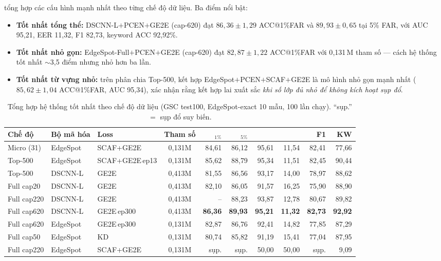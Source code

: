 \documentclass[12pt,a4paper]{report}
\newcommand{\acc}{\text{ACC}}
\newcommand{\eer}{\text{EER}}
\newcommand{\auc}{\text{AUC}}
\newcommand{\best}[1]{\textbf{#1}}
\begin{document}
 tổng hợp các cấu hình mạnh nhất theo từng chế độ dữ liệu.
Ba điểm nổi bật:
\begin{itemize}[leftmargin=1.3em,itemsep=2pt]
\item \textbf{Tốt nhất tổng thể:} DSCNN-L$+$PCEN$+$GE2E (cap-620) đạt
\best{$86{,}36\pm1{,}29$} ACC@1\%FAR và $89{,}93\pm0{,}65$ tại 5\% FAR, với AUC
95{,}21, EER 11{,}32, F1 82{,}73, keyword ACC 92{,}92\%.
\item \textbf{Tốt nhất nhỏ gọn:} EdgeSpot-Full$+$PCEN$+$GE2E (cap-620) đạt
$82{,}87\pm1{,}22$ ACC@1\%FAR với 0{,}131\,M tham số --- cách hệ thống tốt nhất
$\sim$3{,}5 điểm nhưng nhỏ hơn ba lần.
\item \textbf{Tốt nhất từ vựng nhỏ:} trên phân chia Top-500, kết hợp
EdgeSpot$+$PCEN$+$SCAF$+$GE2E là mô hình nhỏ gọn mạnh nhất ($85{,}62\pm1{,}04$
ACC@1\%FAR, AUC 95{,}34), xác nhận rằng kết hợp lai xuất sắc \emph{khi số lớp
đủ nhỏ để không kích hoạt sụp đổ}.
\end{itemize}

\begin{table}[t]
\centering
\caption{Tổng hợp hệ thống tốt nhất theo chế độ dữ liệu (GSC test100,
EdgeSpot-exact 10 mẫu, 100 lần chạy). ``sụp.''$=$ sụp đổ suy biến.}
\label{tab:final}
\small
\setlength{\tabcolsep}{4pt}
\begin{tabular}{l l l c r r r r r r}
\toprule
\textbf{Chế độ} & \textbf{Bộ mã hóa} & \textbf{Loss} & \textbf{Tham số} &
\acc$_{1\%}$ & \acc$_{5\%}$ & \auc & \eer & F1 & KW\\
\midrule
Micro (31)    & EdgeSpot & SCAF+GE2E      & 0{,}131M & 84{,}61 & 86{,}12 & 95{,}61 & 11{,}54 & 82{,}41 & 77{,}66 \\
Top-500       & EdgeSpot & SCAF+GE2E\,ep13& 0{,}131M & 85{,}62 & 88{,}79 & 95{,}34 & 11{,}51 & 82{,}45 & 90{,}44 \\
Top-500       & DSCNN-L  & GE2E           & 0{,}413M & 81{,}55 & 86{,}56 & 93{,}17 & 14{,}00 & 78{,}97 & 88{,}62 \\
Full cap20    & DSCNN-L  & GE2E           & 0{,}413M & 82{,}10 & 86{,}05 & 91{,}57 & 16{,}25 & 75{,}90 & 88{,}90 \\
Full cap220   & DSCNN-L  & GE2E           & 0{,}413M & --    & 88{,}23 & 93{,}87 & 12{,}78 & 80{,}67 & 89{,}82 \\
\rowcolor{blue!7}
Full cap620   & DSCNN-L  & GE2E\,ep300    & 0{,}413M & \best{86{,}36} & \best{89{,}93} & \best{95{,}21} & \best{11{,}32} & \best{82{,}73} & \best{92{,}92} \\
Full cap620   & EdgeSpot & GE2E\,ep300    & 0{,}131M & 82{,}87 & 86{,}76 & 92{,}41 & 14{,}82 & 77{,}85 & 87{,}29 \\
Full cap50    & EdgeSpot & KD             & 0{,}131M & 80{,}74 & 85{,}82 & 91{,}19 & 15{,}41 & 77{,}04 & 87{,}95 \\
Full cap220   & EdgeSpot & SCAF+GE2E      & 0{,}131M & sụp. & sụp. & 50{,}00 & 50{,}00 & sụp. & 9{,}09 \\
\bottomrule
\end{tabular}
\end{table}
\end{document}

